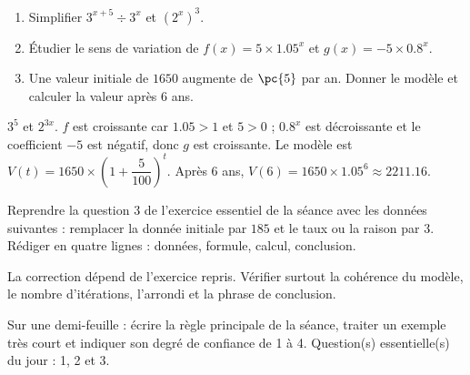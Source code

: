 \begin{exercise}[essentiel]
\begin{enumerate}\item Simplifier $3^{x+5}\div3^x$ et $(2^x)^3$.\item Étudier le sens de variation de $f(x)=5\times\num{1,05}^x$ et $g(x)=-5\times\num{0,8}^x$.\item Une valeur initiale de $1650$ augmente de $\pc{5}$ par an. Donner le modèle et calculer la valeur après $6$ ans.\end{enumerate}
\end{exercise}
\begin{solution}$3^5$ et $2^{3x}$. $f$ est croissante car $\num{1,05}>1$ et $5>0$ ; $\num{0,8}^x$ est décroissante et le coefficient $-5$ est négatif, donc $g$ est croissante. Le modèle est $V(t)=1650\times\left(1+\dfrac{5}{100}\right)^t$. Après $6$ ans, $V(6)=1650\times\num{1,05}^6\approx\num{2211,16}$.\end{solution}


\begin{homework}Reprendre la question 3 de l'exercice essentiel de la séance avec les données suivantes : remplacer la donnée initiale par $185$ et le taux ou la raison par $3$. Rédiger en quatre lignes : données, formule, calcul, conclusion.\end{homework}
\begin{solution}La correction dépend de l'exercice repris. Vérifier surtout la cohérence du modèle, le nombre d'itérations, l'arrondi et la phrase de conclusion.\end{solution}

\begin{exitticket}[3 minutes]Sur une demi-feuille : écrire la règle principale de la séance, traiter un exemple très court et indiquer son degré de confiance de 1 à 4. Question(s) essentielle(s) du jour : 1, 2 et 3.\end{exitticket}


